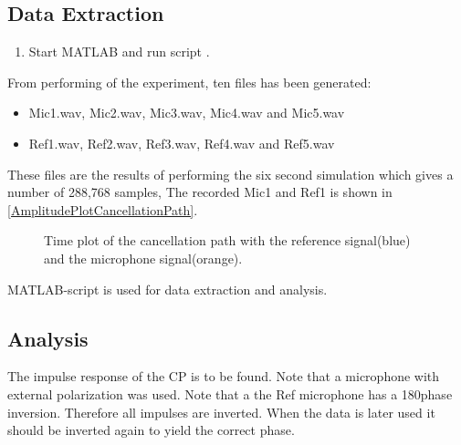 \subsection{Data Extraction}
\begin{enumerate}
	\item Start MATLAB\textsuperscript{\textregistered} and run script .
\end{enumerate}
From performing of the experiment, ten files has been generated:
\begin{itemize}
	\item Mic1.wav, Mic2.wav, Mic3.wav, Mic4.wav and Mic5.wav
	\item Ref1.wav, Ref2.wav, Ref3.wav, Ref4.wav and Ref5.wav
\end{itemize}

These files are the results of performing the six second simulation which gives a number of 288,768 samples, 
The recorded Mic1 and Ref1 is shown in  \autoref{AmplitudePlotCancellationPath}.

\begin{figure}[H]
	\centering
	
	\caption{Time plot of the cancellation path with the reference signal(blue) and the microphone signal(orange).}
	\label{AmplitudePlotCancellationPath}
\end{figure}

MATLAB\textsuperscript{\textregistered}-script  is used for data extraction and analysis.



\subsection{Analysis}
The impulse response of the CP is to be found.
Note that a microphone with external polarization was used. Note that a the Ref microphone has a 180\textdegree phase inversion. Therefore all impulses are inverted. When the data is later used it should be inverted again to yield the correct phase. \cite{michandbook}


